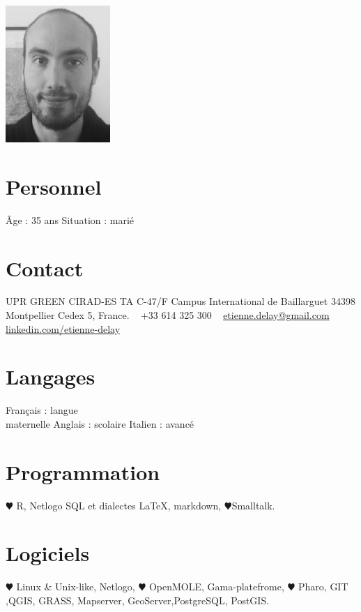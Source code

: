 \documentclass[]{cv-etienne}
\begin{document}

\begin{aside} %
\includegraphics{img/delay_s}
\section{Personnel}
Âge : 35 ans
Situation : marié
\section{Contact}
UPR GREEN
CIRAD-ES
TA C-47/F
Campus International de Baillarguet
34398 Montpellier Cedex 5, France.
~
+33 614 325 300
~
{\color{lightgray} \href{mailto:etienne.delay@gmail.com}{\footnotesize etienne.delay@gmail.com}}
{\color{linkedin} \href{https://fr.linkedin.com/in/etienne-delay-8871a45b}{\footnotesize linkedin.com/etienne-delay}}
\section{Langages}
Français : langue\\ maternelle
Anglais : scolaire
Italien : avancé
\section{Programmation}
{\color{red} $\varheartsuit$} R, Netlogo
SQL et dialectes
\LaTeX, markdown,
{\color{red} $\varheartsuit$}Smalltalk.
\section{Logiciels}
{\color{red} $\varheartsuit$} Linux \& Unix-like,
Netlogo, {\color{red} $\varheartsuit$} OpenMOLE,
Gama-platefrome,
{\color{red} $\varheartsuit$} Pharo, GIT ,QGIS,
GRASS, Mapserver, GeoServer,PostgreSQL, PostGIS.
\end{aside}
\end{document}
